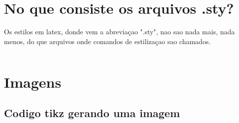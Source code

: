 \documentclass[bigger]{beamer}
\begin{document}
{\section{No que consiste os arquivos .sty?}
\label{sec:org9169b6f}

Os \alert{estilos} em latex, donde vem a abreviaçao ".sty", nao sao nada
mais, nada menos, do que arquivos onde comandos de estilizaçao sao
chamados.

\inputminted[firstline=90,lastline=103, frame=lines,framesep=2mm,baselinestretch=1.2,bgcolor=black,fontsize=\scriptsize]{latex}{./mtheme/beamerouterthememetropolis.sty}


\section{Imagens}
\label{sec:org80a2e28}
\subsection{Codigo tikz gerando uma imagem}
\label{sec:org886f43d}
\begin{frame}[label={sec:org2f3a064},fragile,shrink=0]{}
 \vspace{5mm}


\end{frame}}
\end{document}
